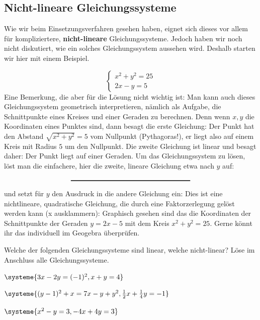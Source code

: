 \documentclass[11pt,oneside]{article}
\begin{document}
\subsection{Nicht-lineare Gleichungssysteme}
	Wie wir beim Einsetzungsverfahren gesehen haben, eignet sich dieses vor allem für kompliziertere, \textbf{nicht-lineare} Gleichungssysteme. Jedoch haben wir noch nicht diskutiert, wie ein solches Gleichungssystem aussehen wird. Deshalb starten wir hier mit einem Beispiel.
	\begin{beispiel}
		\[\left\{
		\begin{matrix}
			x^2+y^2=25\\
			2x-y=5
		\end{matrix}\right.\]
		Eine Bemerkung, die aber für die Lösung nicht wichtig ist: Man kann auch dieses Gleichungssystem geometrisch interpretieren, nämlich als Aufgabe, die Schnittpunkte eines Kreises und einer Geraden zu berechnen. Denn wenn $x,y$ die Koordinaten eines Punktes sind, dann besagt die erste Gleichung: Der Punkt hat den Abstand  $\sqrt{x^2+y^2}=5$  vom Nullpunkt (Pythagoras!), er liegt also auf einem Kreis mit Radius $5$ um den Nullpunkt. Die zweite Gleichung ist linear und besagt daher: Der Punkt liegt auf einer Geraden.\vspace*{11pt}\newline
		Um das Gleichungssystem zu lösen, löst man die einfachere, hier die zweite, lineare Gleichung etwa nach $y$ auf:\[\gap{6}\] und setzt für $y$ den Ausdruck in die andere Gleichung ein:\vspace*{5pt}\newline{}
		Dies ist eine nichtlineare, quadratische Gleichung, die durch eine Faktorzerlegung gelöst werden kann (x ausklammern):\vspace*{5pt}\newline{}
		Graphisch gesehen sind das die Koordinaten der Schnittpunkte der Geraden $y=2x-5$ mit dem Kreis $x^2+y^2=25$. Gerne könnt ihr das individuell im Geogebra überprüfen.
	\end{beispiel}
	\begin{aufgabe}
		Welche der folgenden Gleichungssysteme sind linear, welche nicht-linear? Löse im Anschluss alle Gleichungssysteme.
		\begin{enumcols}[3]
				\item $\systeme{3x-2y=(-1)^2,x+y=4}$
				\item $\systeme{(y-1)^2+x =7 x - y+y^2, \frac{1}{2}x+\frac{1}{4}y= -1}$
				\item $\systeme{x^2-y=3,-4x+4y=3}$
		\end{enumcols}
	\end{aufgabe}
	\newpage
\end{document}
